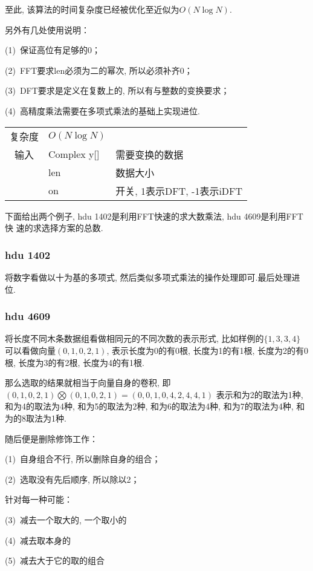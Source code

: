 至此, 该算法的时间复杂度已经被优化至近似为$O(N \log N)$.

另外有几处使用说明：

(1)\ 保证高位有足够的0；

(2)\ FFT要求len必须为二的幂次, 所以必须补齐0；

(3)\ DFT要求是定义在复数上的, 所以有与整数的变换要求；

(4)\ 高精度乘法需要在多项式乘法的基础上实现进位.

\begin{longtable}{|c|l|l|}
复杂度 & $O(N\log N)$ &  \\
输入 & Complex y[] & 需要变换的数据 \\
 & len & 数据大小 \\
 & on & 开关, 1表示DFT, -1表示iDFT \\
\end{longtable}
下面给出两个例子, hdu 1402是利用FFT快速的求大数乘法, hdu 4609是利用FFT快
速的求选择方案的总数.


        \subsubsection{hdu 1402}\small
将数字看做以十为基的多项式, 然后类似多项式乘法的操作处理即可.最后处理进位.



        \subsubsection{hdu 4609}\small
将长度不同木条数据组看做相同元的不同次数的表示形式, 比如样例的$\{1, 3, 3, 4\}$
可以看做向量$(0, 1, 0, 2, 1)$, 表示长度为0的有0根, 长度为1的有1根, 长度为2的有0根, 
长度为3的有2根, 长度为4的有1根.

那么选取的结果就相当于向量自身的卷积, 即
$(0, 1, 0, 2, 1)\bigotimes (0, 1, 0, 2, 1) = (0, 0, 1, 0, 4, 2, 4, 4, 1)$
表示和为2的取法为1种, 和为4的取法为4种, 和为5的取法为2种, 和为6的取法为4种, 
和为7的取法为4种, 和为的8取法为1种.

随后便是删除修饰工作：

(1)\ 自身组合不行, 所以删除自身的组合；

(2)\ 选取没有先后顺序, 所以除以2；

针对每一种可能：

(3)\ 减去一个取大的, 一个取小的

(4)\ 减去取本身的

(5)\ 减去大于它的取的组合



